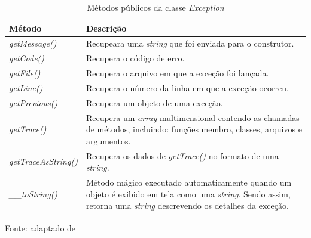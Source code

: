 \begin{table}[h!tb]
	\centering
	\setlength{\belowcaptionskip}{9pt}
	\caption{Métodos públicos da classe \textit{Exception}}
	\begin{tabular}{| l | p{} |}

		\hline
		\textbf{Método}
		& \textbf{Descrição} \\
		\hline

        \textit{getMessage()}
        & Recupeara uma \textit{string} que foi enviada
        para o construtor.

        \\ \cline{1-2}
        \textit{getCode()}
        & Recupera o código de erro.
        \\ \cline{1-2}

        \textit{getFile()}
        & Recupera o arquivo em que a exceção foi lançada.
        \\ \cline{1-2}

        \textit{getLine()}
        & Recupera o número da linha em que a exceção ocorreu.
        \\ \cline{1-2}

        \textit{getPrevious()}
        & Recupera um objeto de uma exceção.
        \\ \cline{1-2}

        \textit{getTrace()}
        & Recupera um \textit{array} multimensional contendo as chamadas de
        métodos, incluindo: funções membro, classes, arquivos e argumentos. \\
        \cline{1-2}

        \textit{getTraceAsString()}
        & Recupera os dados de \textit{getTrace()} no formato de uma
        \textit{string}.
        \\ \cline{1-2}

        \textit{\_\_toString()}
        & Método mágico executado automaticamente quando um objeto é exibido em
        tela como uma \textit{string}. Sendo assim, retorna uma \textit{string}
        descrevendo os detalhes da exceção.
        \\
        \hline
	\end{tabular}
	\newline
	\newline
	\label{tab:excecao}
	\begin{footnotesize}
		Fonte: adaptado de \cite[p.53]{phpObjectsPatternsAndPractice}
	\end{footnotesize}
\end{table}

